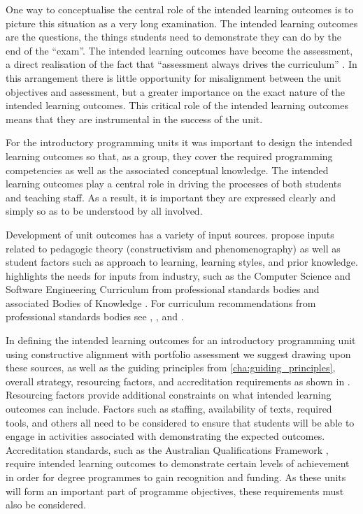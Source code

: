 One way to conceptualise the central role of the intended learning outcomes is to picture this situation as a very long examination. The intended learning outcomes are the questions, the things students need to demonstrate they can do by the end of the ``exam''. The intended learning outcomes have become the assessment, a direct realisation of the fact that ``assessment always drives the curriculum'' \cite{Ramsden:2003}.  In this arrangement there is little opportunity for misalignment between the unit objectives and assessment, but a greater importance on the exact nature of the intended learning outcomes. This critical role of the intended learning outcomes means that they are instrumental in the success of the unit. 

For the introductory programming units it was important to design the intended learning outcomes so that, as a group, they cover the required programming competencies as well as the associated conceptual knowledge. The intended learning outcomes play a central role in driving the processes of both students and teaching staff. As a result, it is important they are expressed clearly and simply so as to be understood by all involved.

Development of unit outcomes has a variety of input sources. \citet{Thota:2010} propose inputs related to pedagogic theory (constructivism and phenomenography) as well as student factors such as approach to learning, learning styles, and prior knowledge. \citet{Armarego:2009} highlights the needs for inputs from industry, such as the Computer Science and Software Engineering Curriculum from professional standards bodies and associated Bodies of Knowledge \citet{Abran:2001}. For curriculum recommendations from professional standards bodies see \citet{Lethbridge:2006}, \citet{Cassel:2008}, and \citet{CSC2013}.

In defining the intended learning outcomes for an introductory programming unit using constructive alignment with portfolio assessment we suggest drawing upon these sources, as well as the guiding principles from \cref{cha:guiding_principles}, overall strategy, resourcing factors, and accreditation requirements as shown in . Resourcing factors provide additional constraints on what intended learning outcomes can include. Factors such as staffing, availability of texts, required tools, and others all need to be considered to ensure that students will be able to engage in activities associated with demonstrating the expected outcomes. Accreditation standards, such as the Australian Qualifications Framework \cite{AQF:2013}, require intended learning outcomes to demonstrate certain levels of achievement in order for degree programmes to gain recognition and funding. As these units will form an important part of programme objectives, these requirements must also be considered. 

